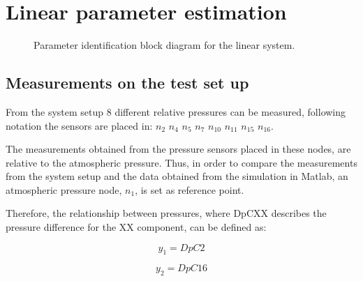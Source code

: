 \section{Linear parameter estimation} 
\label{LinParamEst}


\begin{figure}[H]
\centering
 
\caption{Parameter identification block diagram for the linear system. }
\label{fig:parame_block_lin}
\end{figure}

\subsection{Measurements on the test set up}
\label{LinParamEst_measurements}

From the system setup $8$ different relative pressures can be measured, following  notation the sensors are placed in: 
$n_2$ $n_4$ $n_5$ $n_7$ $n_{10}$ $n_{11}$ $n_{15}$ $n_{16}$.

The measurements obtained from the pressure sensors placed in these nodes, are relative to the atmospheric pressure. Thus, in order to compare the measurements
from the system setup and the data obtained from the simulation in Matlab, an atmospheric pressure node, $n_1$, is set as reference point.

Therefore, the relationship between pressures, where DpCXX describes the pressure difference for the XX component, can be defined as:

\vspace{4mm}
\begin{equation}
     y_1 = DpC2 
\end{equation}

\vspace{4mm}
\begin{equation}
   y_2 = DpC16 
\end{equation}


